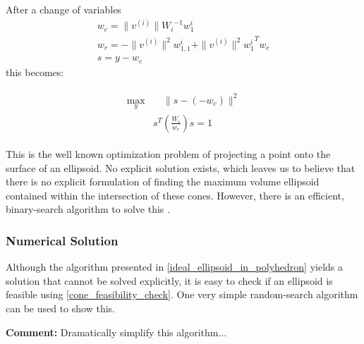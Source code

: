 \documentclass{article}
\newenvironment{comment}
  {\par\medskip
   \color{red}%
   \begin{framed}
   \textbf{Comment: }\ignorespaces}
 {\end{framed}
  \medskip}
\theoremstyle{case}
\numberwithin{theorem}{subsection}
\begin{document}
After a change of variables
\begin{align*}
w_c = \|v^{(i)}\|{W_i}^{-1}w_1^i \\
w_r =  - \|v^{(i)}\|^2{w_{1,1}^i} + \|v^{(i)}\|^2{{w_1^i}}^Tw_c \\
s = y - w_c
\end{align*}
this becomes:

\begin{align}
\label{cone_feasibility_check}
\begin{array}{ccc}
\max_{y} & \quad \|s - \left(-w_c\right)\|^2  \\
 & s^T\left(\frac {W_i}{w_r}\right)s = 1
 \end{array}
\end{align}

This is the well known optimization problem of projecting a point onto the surface of an ellipsoid.
No explicit solution exists, which leaves us to believe that there is no explicit formulation of finding the maximum volume ellipsoid contained within the intersection of these cones.
However, there is an efficient, binary-search algorithm to solve this \cite{projecttoellipsoid}.

\subsubsection{Numerical Solution}

Although the algorithm presented in \cref{ideal_ellipsoid_in_polyhedron} yields a solution that cannot be solved explicitly, it is easy to check if an ellipsoid is feasible using \cref{cone_feasibility_check}.
One very simple random-search algorithm can be used to show this.

\begin{comment}
Dramatically simplify this algorithm...
\end{comment}
\end{document}

